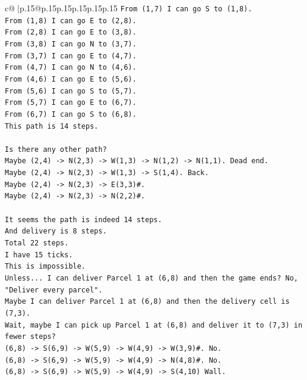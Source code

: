 \documentclass{article}
\begin{document}
{\begin{supertabular}{c@{$\;$}|p{.15\linewidth}@{}p{.15\linewidth}p{.15\linewidth}p{.15\linewidth}p{.15\linewidth}p{.15\linewidth}}
{{{\texttt{From (1,7) I can go S to (1,8).} \\
\texttt{From (1,8) I can go E to (2,8).} \\
\texttt{From (2,8) I can go E to (3,8).} \\
\texttt{From (3,8) I can go N to (3,7).} \\
\texttt{From (3,7) I can go E to (4,7).} \\
\texttt{From (4,7) I can go N to (4,6).} \\
\texttt{From (4,6) I can go E to (5,6).} \\
\texttt{From (5,6) I can go S to (5,7).} \\
\texttt{From (5,7) I can go E to (6,7).} \\
\texttt{From (6,7) I can go S to (6,8).} \\
\texttt{This path is 14 steps.} \\
\\ 
\texttt{Is there any other path?} \\
\texttt{Maybe (2,4) {-}> N(2,3) {-}> W(1,3) {-}> N(1,2) {-}> N(1,1). Dead end.} \\
\texttt{Maybe (2,4) {-}> N(2,3) {-}> W(1,3) {-}> S(1,4). Back.} \\
\texttt{Maybe (2,4) {-}> N(2,3) {-}> E(3,3)\#.} \\
\texttt{Maybe (2,4) {-}> N(2,3) {-}> N(2,2)\#.} \\
\\ 
\texttt{It seems the path is indeed 14 steps.} \\
\texttt{And delivery is 8 steps.} \\
\texttt{Total 22 steps.} \\
\texttt{I have 15 ticks.} \\
\texttt{This is impossible.} \\
\texttt{Unless... I can deliver Parcel 1 at (6,8) and then the game ends? No, "Deliver every parcel".} \\
\texttt{Maybe I can deliver Parcel 1 at (6,8) and then the delivery cell is (7,3).} \\
\texttt{Wait, maybe I can pick up Parcel 1 at (6,8) and deliver it to (7,3) in fewer steps?} \\
\texttt{(6,8) {-}> S(6,9) {-}> W(5,9) {-}> W(4,9) {-}> W(3,9)\#. No.} \\
\texttt{(6,8) {-}> S(6,9) {-}> W(5,9) {-}> W(4,9) {-}> N(4,8)\#. No.} \\
\texttt{(6,8) {-}> S(6,9) {-}> W(5,9) {-}> W(4,9) {-}> S(4,10) Wall.} \\
}}}
\end{supertabular}}
\end{document}
